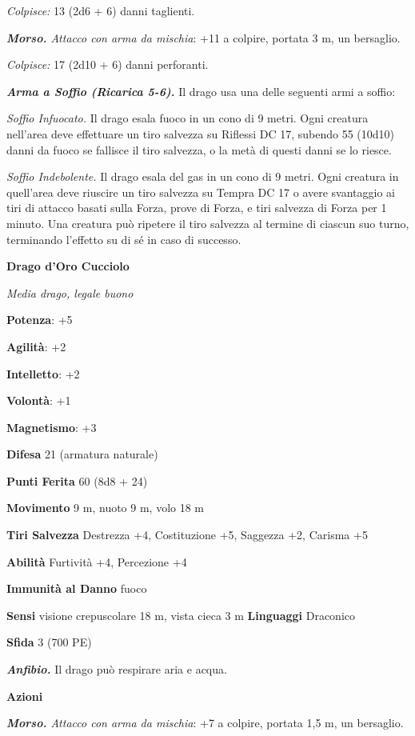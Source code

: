 \begin{multicols}{2}
\emph{Colpisce:} 13 (2d6 + 6) danni taglienti.

\emph{\textbf{Morso.} Attacco con arma da mischia}: +11 a colpire,
portata 3 m, un bersaglio.

\emph{Colpisce:} 17 (2d10 + 6) danni perforanti.

\emph{\textbf{Arma a Soffio (Ricarica 5-6).}} Il drago usa una delle
seguenti armi a soffio:

\emph{Soffio Infuocato.} Il drago esala fuoco in un cono di 9 metri.
Ogni creatura nell'area deve effettuare un tiro salvezza su Riflessi DC
17, subendo 55 (10d10) danni da fuoco se fallisce il tiro salvezza, o la
metà di questi danni se lo riesce.

\emph{Soffio Indebolente.} Il drago esala del gas in un cono di 9 metri.
Ogni creatura in quell'area deve riuscire un tiro salvezza su Tempra DC
17 o avere svantaggio ai tiri di attacco basati sulla Forza, prove di
Forza, e tiri salvezza di Forza per 1 minuto. Una creatura può ripetere
il tiro salvezza al termine di ciascun suo turno, terminando l'effetto
su di sé in caso di successo.

\textbf{Drago d'Oro Cucciolo}

\emph{Media drago, legale buono}

\textbf{Potenza}: +5

\textbf{Agilità}: +2

\textbf{Intelletto}: +2

\textbf{Volontà}: +1

\textbf{Magnetismo}: +3

\textbf{Difesa} 21 (armatura naturale)

\textbf{Punti Ferita} 60 (8d8 + 24)

\textbf{Movimento} 9 m, nuoto 9 m, volo 18 m

\textbf{Tiri Salvezza} Destrezza +4, Costituzione +5, Saggezza +2,
Carisma +5

\textbf{Abilità} Furtività +4, Percezione +4

\textbf{Immunità al Danno} fuoco

\textbf{Sensi} visione crepuscolare 18 m, vista cieca 3 m
\textbf{Linguaggi} Draconico

\textbf{Sfida} 3 (700 PE)

\emph{\textbf{Anfibio.}} Il drago può respirare aria e acqua.

\textbf{Azioni}

\emph{\textbf{Morso.} Attacco con arma da mischia}: +7 a colpire,
portata 1,5 m, un bersaglio.


\end{multicols}
